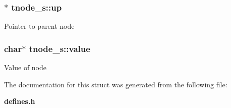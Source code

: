 \subsubsection{$\ast$ {\bf tnode\_\-s::up}}\label{structtnode__s_o4}


Pointer to parent node 
\subsubsection{\setlength{\rightskip}{0pt plus 5cm}char$\ast$ {\bf tnode\_\-s::value}}\label{structtnode__s_o1}


Value of node 

The documentation for this struct was generated from the following file:\begin{CompactItemize}
\item 
{\bf defines.h}\end{CompactItemize}
